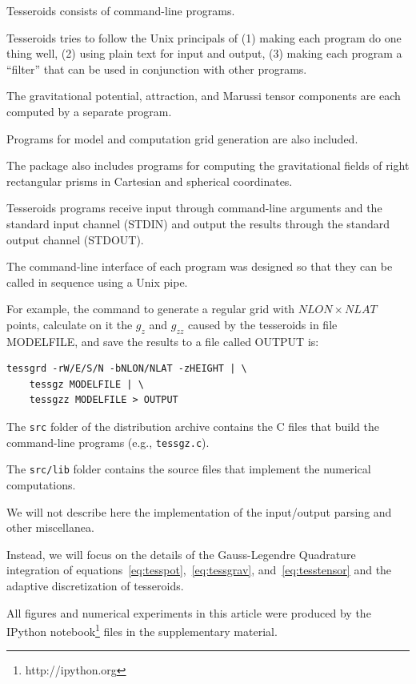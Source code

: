 \documentclass[manuscript]{geophysics}
\begin{document}
Tesseroids consists of command-line programs.

Tesseroids tries to follow the Unix principals of
(1) making each program do one thing well,
(2) using plain text for input and output,
(3) making each program a ``filter'' that can be used in conjunction with other
programs.

The gravitational potential, attraction, and Marussi tensor components
are each computed by a separate program.

Programs for model and computation grid generation are also included.

The package also includes programs for computing the gravitational fields of
right rectangular prisms in Cartesian and spherical coordinates.

Tesseroids programs receive input through command-line arguments and the
standard input channel (STDIN) and output the results through
the standard output channel (STDOUT).

The command-line interface of each program was designed so that they
can be called in sequence using a Unix pipe.

For example, the command to
generate a regular grid with $NLON \times NLAT$ points,
calculate on it the $g_z$ and $g_{zz}$ caused by the tesseroids in file
MODELFILE,
and save the results to a file called OUTPUT
is:

\begin{verbatim}
tessgrd -rW/E/S/N -bNLON/NLAT -zHEIGHT | \
    tessgz MODELFILE | \
    tessgzz MODELFILE > OUTPUT
\end{verbatim}



The \texttt{src} folder of the distribution archive
contains the C files that build the command-line programs
(e.g., \texttt{tessgz.c}).

The \texttt{src/lib} folder contains the source files that implement the
numerical computations.

We will not describe here the implementation of the input/output parsing and
other miscellanea.

Instead, we will focus on the details of the Gauss-Legendre Quadrature
integration of equations~\ref{eq:tesspot},~\ref{eq:tessgrav},
and~\ref{eq:tesstensor}
and the adaptive discretization of tesseroids.



All figures and numerical experiments in this article were produced by the
IPython notebook\footnote{http://ipython.org}
files \citep{Perez2007} in the supplementary material.
\end{document}
